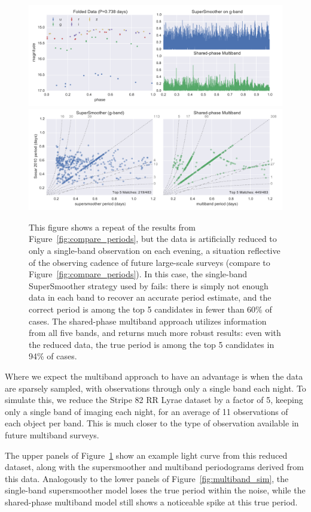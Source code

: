 \documentclass[12pt,preprint]{aastex}
\newcommand{\Fig}[1]{Figure~\ref{fig:#1}}
\newcommand{\fig}[1]{\Fig{#1}}
\newcommand{\figlabel}[1]{\label{fig:#1}}
\begin{document}
\begin{figure}
  \centering
  \includegraphics[width=\textwidth]{fig08a.pdf}
  \includegraphics[width=\textwidth]{fig08b.pdf}
  \caption{
    This figure shows a repeat of the results from \fig{compare_periods}, but the data is artificially reduced to only a single-band observation on each evening, a situation reflective of the observing cadence of future large-scale surveys (compare to \fig{compare_periods}).
    In this case, the single-band SuperSmoother strategy used by \citet{Sesar2010} fails: there is simply not enough data in each band to recover an accurate period estimate, and the correct period is among the top 5 candidates in fewer than 60\% of cases.
    The shared-phase multiband approach utilizes information from all five bands, and returns much more robust results: even with the reduced data, the true period is among the top 5 candidates in 94\% of cases.
  } 
  \figlabel{compare_periods_reduced}
\end{figure}

Where we expect the multiband approach to have an advantage is when the data are sparsely sampled, with observations through only a single band each night. To simulate this, we reduce the Stripe 82 RR Lyrae dataset by a factor of 5, keeping only a single band of imaging each night, for an average of 11 observations of each object per band. This is much closer to the type of observation available in future multiband surveys.

The upper panels of \fig{compare_periods_reduced} show an example light curve from this reduced dataset, along with the supersmoother and multiband periodograms derived from this data. Analogously to the lower panels of \fig{multiband_sim}, the single-band supersmoother model loses the true period within the noise, while the shared-phase multiband model still shows a noticeable spike at this true period.
\end{document}
